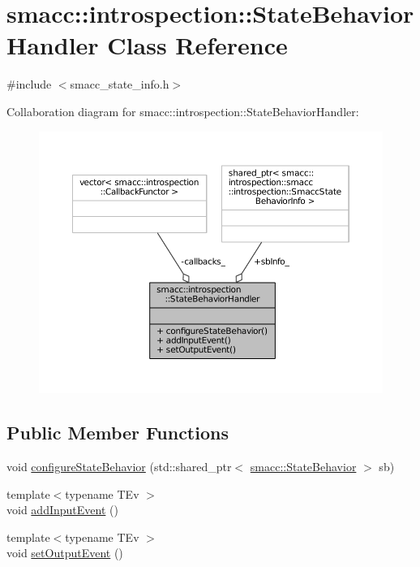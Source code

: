 \hypertarget{classsmacc_1_1introspection_1_1StateBehaviorHandler}{}\section{smacc\+:\+:introspection\+:\+:State\+Behavior\+Handler Class Reference}
\label{classsmacc_1_1introspection_1_1StateBehaviorHandler}


{\ttfamily \#include $<$smacc\+\_\+state\+\_\+info.\+h$>$}



Collaboration diagram for smacc\+:\+:introspection\+:\+:State\+Behavior\+Handler\+:
\nopagebreak
\begin{figure}[H]
\begin{center}
\leavevmode
\includegraphics[width=350pt]{classsmacc_1_1introspection_1_1StateBehaviorHandler__coll__graph}
\end{center}
\end{figure}
\subsection*{Public Member Functions}
\begin{DoxyCompactItemize}
\item 
void \hyperlink{classsmacc_1_1introspection_1_1StateBehaviorHandler_aefcd40058547a808232ebb0258a08d61}{configure\+State\+Behavior} (std\+::shared\+\_\+ptr$<$ \hyperlink{classsmacc_1_1StateBehavior}{smacc\+::\+State\+Behavior} $>$ sb)
\item 
{\footnotesize template$<$typename T\+Ev $>$ }\\void \hyperlink{classsmacc_1_1introspection_1_1StateBehaviorHandler_aa4f2ae7831cd27dfe47bd89882aceeb7}{add\+Input\+Event} ()
\item 
{\footnotesize template$<$typename T\+Ev $>$ }\\void \hyperlink{classsmacc_1_1introspection_1_1StateBehaviorHandler_a2579188153b8e819f981c9e39850704e}{set\+Output\+Event} ()
\end{DoxyCompactItemize}
